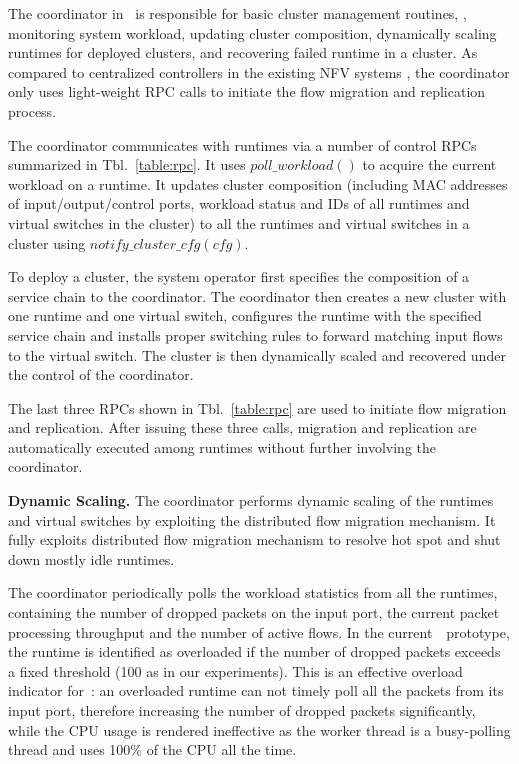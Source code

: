 The coordinator in \nfactor~is responsible for basic cluster management routines, \eg, monitoring system workload, updating cluster composition,  dynamically scaling runtimes for deployed clusters, and recovering failed runtime in a cluster. As compared to centralized controllers in the existing NFV systems \cite{gember2015opennf, rajagopalan2013split}, the coordinator only uses light-weight RPC calls to initiate the flow migration and replication process.

The coordinator communicates with runtimes via a number of control RPCs summarized in Tbl.~\ref{table:rpc}. It uses $poll\_workload()$ to acquire the current workload on a runtime. It updates cluster composition (including MAC addresses of input/output/control ports, workload status and IDs of all runtimes and virtual switches in the cluster) to all the runtimes and virtual switches in a cluster using $notify\_cluster\_cfg(cfg)$.

To deploy a cluster, the system operator first specifies the composition of a service chain to the coordinator. The coordinator then creates a new cluster with one runtime and one virtual switch, configures the runtime with the specified service chain and installs proper switching rules to forward matching input flows to the virtual switch. The cluster is then dynamically scaled and recovered under the control of the coordinator.

The last three RPCs shown in Tbl.~\ref{table:rpc} are used to initiate flow migration and replication. After issuing these three calls, migration and replication are automatically executed among runtimes without further involving the coordinator.


\textbf{Dynamic Scaling.} The coordinator performs dynamic scaling of the runtimes and virtual switches by exploiting the distributed flow migration mechanism. It fully exploits distributed flow migration mechanism to resolve hot spot and shut down mostly idle runtimes.

The coordinator periodically polls the workload statistics from all the runtimes, containing the number of dropped packets on the input port, the current packet processing throughput and the number of active flows. In the current~\nfactor~prototype, the runtime is identified as overloaded if the number of dropped packets exceeds a fixed threshold (100 as in our experiments). This is an effective overload indicator for~\nfactor: an overloaded runtime can not timely poll all the packets from its input port, therefore increasing the number of dropped packets significantly, while the CPU usage is rendered ineffective as the worker thread is a busy-polling thread and uses 100\% of the CPU all the time.

